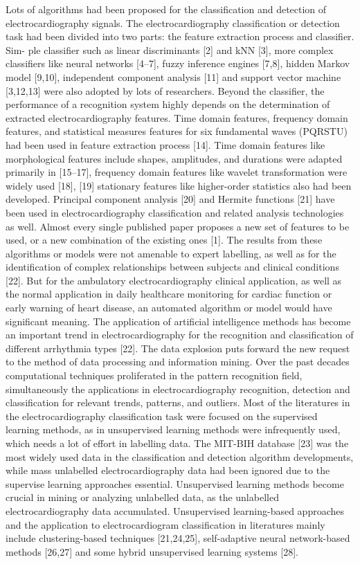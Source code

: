 \documentclass[journal]{IEEEtran}
\begin{document}
Lots of algorithms had been proposed for the classification and detection of electrocardiography signals. The electrocardiography classification or detection task had been divided into two parts: the feature extraction process and classifier. Sim- ple classifier such as linear discriminants [2] and kNN [3], more complex classifiers like neural networks [4–7], fuzzy inference engines [7,8], hidden Markov model [9,10], independent component analysis [11] and support vector machine [3,12,13] were also adopted by lots of researchers.
Beyond the classifier, the performance of a recognition system highly depends on the determination of extracted electrocardiography features. Time domain features, frequency domain features, and statistical measures features for six fundamental waves (PQRSTU) had been used in feature extraction process [14]. Time domain features like morphological features include shapes, amplitudes, and durations were adapted primarily in [15–17], frequency domain features like wavelet transformation were widely used [18], [19] stationary features like higher-order statistics also had been developed. Principal component analysis [20] and Hermite functions [21] have been used in electrocardiography classification and related analysis technologies as well. Almost every single published paper proposes a new set of features to be used, or a new combination of the existing ones [1].
The results from these algorithms or models were not amenable to expert labelling, as well as for the identification of complex relationships between subjects and clinical conditions [22]. But for the ambulatory electrocardiography clinical application, as well as the normal application in daily healthcare monitoring for cardiac function or early warning of heart disease, an automated algorithm or model would have significant meaning. The application of artificial intelligence methods has become an important trend in electrocardiography for the recognition and classification of different arrhythmia types [22]. The data explosion puts forward the new request to the method of data processing and information mining.
Over the past decades computational techniques proliferated in the pattern recognition field, simultaneously the applications in electrocardiography recognition, detection and classification for relevant trends, patterns, and outliers. Most of the literatures in the electrocardiography classification task were focused on the supervised learning methods, as in unsupervised learning methods were infrequently used, which needs a lot of effort in labelling data. The MIT-BIH database [23] was the most widely used data in the classification and detection algorithm developments, while mass unlabelled electrocardiography data had been ignored due to the supervise learning approaches essential. Unsupervised learning methods become crucial in mining or analyzing unlabelled data, as the unlabelled electrocardiography data accumulated. Unsupervised learning-based approaches and the application to electrocardiogram classification in literatures mainly include clustering-based techniques [21,24,25], self-adaptive neural network-based methods [26,27] and some hybrid unsupervised learning systems [28].
\end{document}

